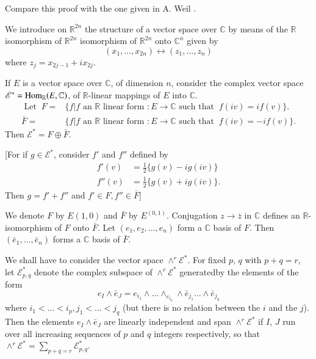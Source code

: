 Compare this proof with the one given in A. Weil \cite{43}.

We introduce on $\mathbb{R}^{2n}$ the structure of a vector space over
$\mathbb{C} $ by means of the $\mathbb{R}$ isomorphism of
$\mathbb{R}^{2n}$ isomorphism of $\mathbb{R}^{2n}$ onto $\mathbb{C}^n$ 
given by  
$$
(x_1, \ldots, x_{2n}) \leftrightarrow (z_1, \ldots , z_n)
$$
where $z_j = x_{2{j-1}} + i x_{2j}$.

If $E$ is a vector space over $\mathbb{C} $, of dimension $n$,
consider the complex vector space $\mathscr{E}^* = \operatorname{Hom}_{\mathbb{R}}
(E,\mathbb{C})$, of $\mathbb{R}$-linear mappings of $E$ into
$\mathbb{C} $. 
\begin{align*}
  \text{ Let }~ F = & \{ f | f \text{ an } \mathbb{R} \text{ linear
    form }: E \to \mathbb{C} \text{ such that }~ f(iv) = if (v) \}. \\ 
  \bar{F} = & \{ f | f \text{ an } \mathbb{R} \text{ linear form }: E
  \to \mathbb{C} \text{ such that }~ f(iv) = - if (v) \}. 
\end{align*}
Then \qquad $\mathscr{E}^* = F \oplus \bar{F}$.

[For if $g \in \mathscr{E}^*$, consider $f'$ and $f''$ defined by 
\begin{align*}
  f' (v) & = \frac{1}{2} \{ g(v) - ig (iv) \}\\
  f'' (v) & = \frac{1}{2} \{ g(v) + ig (iv) \}.
\end{align*}
Then $ g= f' + f''$ and $f' \in F, f'' \in \bar{F}$]

We denote $F$ by $E(1, 0)$ and $\bar{F}$ by $E^{(0, 1)}$. Conjugation
$z \to \bar{z}$ in $\mathbb{C}$ defines an $\mathbb{R}$-isomorphism of
$F$ onto $\bar{F}$. Let $(e_1, e_2, \ldots, e_n)$ form a $\mathbb{C}$
basis of $F$. Then $(\bar{e}_1 , \ldots , \bar{e}_n)$ forms a $
\mathbb{C}$ basis of $\bar{F}$. 

We shall have to consider the vector space $\wedge^r
\mathscr{E}^*$. For fixed $p$, $q$ with $p+q = r$, let
$\mathscr{E}^*_{p, q}$ denote the complex subspace of $\wedge^r
\mathscr{E}^*$ generated\pageoriginale by the elements of the form  
$$
e_I \wedge \bar{e}_J = e_{i_1} \wedge \ldots \wedge_{e_{i_p}} \wedge
\bar{e}_{j_1} \ldots \wedge \bar{e}_{j_q} 
$$
where $i_1 < \ldots < i_p , j_1 < \ldots < j_q$ (but there is no
relation between the $i$ and the $j$). Then the elements $e_I \wedge
\bar{e}_J$ are linearly independent and span $\wedge ^r \mathscr{E}^*$
if $I$, $J$ run over all increasing sequences of $p$ and $q$ integers
respectively, so that $\wedge^r \mathscr{E}^* = \sum \limits_{p+q =r}
\mathscr{E}^*_{p,q}$. 

